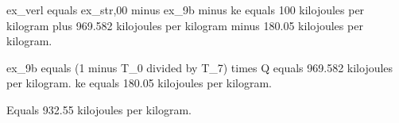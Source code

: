 ex_verl equals ex_str,00 minus ex_9b minus ke equals 100 kilojoules per kilogram plus 969.582 kilojoules per kilogram minus 180.05 kilojoules per kilogram.  

ex_9b equals (1 minus T_0 divided by T_7) times Q equals 969.582 kilojoules per kilogram.  
ke equals 180.05 kilojoules per kilogram.  

Equals 932.55 kilojoules per kilogram.